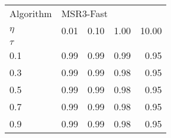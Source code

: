 \begin{tabular}{l||rrrr}
\toprule
Algorithm & \multicolumn{4}{l}{MSR3-Fast} \\
$\eta$ &     0.01  & 0.10  & 1.00  & 10.00 \\
\hline \hline
$\tau$ &           &       &       &       \\
0.1 &      0.99 &  0.99 &  0.99 &  0.95 \\
0.3 &      0.99 &  0.99 &  0.98 &  0.95 \\
0.5 &      0.99 &  0.99 &  0.98 &  0.95 \\
0.7 &      0.99 &  0.99 &  0.98 &  0.95 \\
0.9 &      0.99 &  0.99 &  0.98 &  0.95 \\
\bottomrule
\end{tabular}
